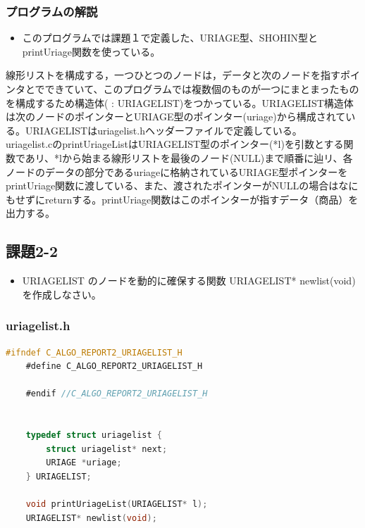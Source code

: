 \documentclass[10pt]{article}
\begin{document}
\subsubsection{プログラムの解説}
\begin{itemize}
    \item このプログラムでは課題１で定義した、URIAGE型、SHOHIN型とprintUriage関数を使っている。
\end{itemize}
線形リストを構成する，一つひとつのノードは，データと次のノードを指すポインタとでできていて、このプログラムでは複数個のものが一つにまとまったものを構成するため構造体( : URIAGELIST)をつかっている。URIAGELIST構造体は次のノードのポインターとURIAGE型のポインター(uriage)から構成されている。URIAGELISTはuriagelist.hヘッダーファイルで定義している。 \\

uriagelist.cのprintUriageListはURIAGELIST型のポインター(*l)を引数とする関数であリ、*lから始まる線形リストを最後のノード(NULL)まで順番に辿リ、各ノードのデータの部分であるuriageに格納されているURIAGE型ポインターをprintUriage関数に渡している、また、渡されたポインターがNULLの場合はなにもせずにreturnする。printUriage関数はこのポインターが指すデータ（商品）を出力する。


\subsection{課題2-2}
\begin{itemize}
    \item URIAGELIST のノードを動的に確保する関数 URIAGELIST* newlist(void) を作成しなさい。
\end{itemize}
\subsubsection{uriagelist.h}
\begin{lstlisting}[language=C]
    #ifndef C_ALGO_REPORT2_URIAGELIST_H
    #define C_ALGO_REPORT2_URIAGELIST_H
    
    #endif //C_ALGO_REPORT2_URIAGELIST_H
    
    
    typedef struct uriagelist {
        struct uriagelist* next;
        URIAGE *uriage;
    } URIAGELIST;
    
    void printUriageList(URIAGELIST* l);
    URIAGELIST* newlist(void);
\end{lstlisting}
\end{document}

